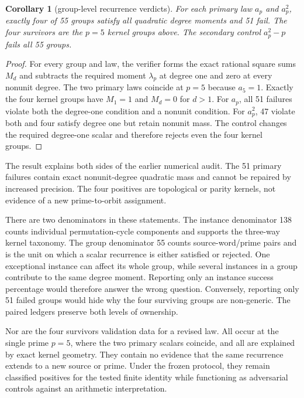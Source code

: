 \documentclass[11pt]{article}
\newtheorem{corollary}[theorem]{Corollary}
\theoremstyle{definition}
\theoremstyle{remark}
\begin{document}
\begin{corollary}[group-level recurrence verdicts]\label{cor:groups}
For each primary law $a_p$ and $a_p^2$, exactly four of 55 groups satisfy all quadratic degree moments and 51 fail. The four survivors are the $p=5$ kernel groups above. The secondary control $a_p^2-p$ fails all 55 groups.
\end{corollary}

\begin{proof}
For every group and law, the verifier forms the exact rational square sums $M_d$ and subtracts the required moment $\lambda_p$ at degree one and zero at every nonunit degree. The two primary laws coincide at $p=5$ because $a_5=1$. Exactly the four kernel groups have $M_1=1$ and $M_d=0$ for $d>1$. For $a_p$, all 51 failures violate both the degree-one condition and a nonunit condition. For $a_p^2$, 47 violate both and four satisfy degree one but retain nonunit mass. The control changes the required degree-one scalar and therefore rejects even the four kernel groups.
\end{proof}

The result explains both sides of the earlier numerical audit. The 51 primary failures contain exact nonunit-degree quadratic mass and cannot be repaired by increased precision. The four positives are topological or parity kernels, not evidence of a new prime-to-orbit assignment.

There are two denominators in these statements. The instance denominator 138 counts individual permutation-cycle components and supports the three-way kernel taxonomy. The group denominator 55 counts source-word/prime pairs and is the unit on which a scalar recurrence is either satisfied or rejected. One exceptional instance can affect its whole group, while several instances in a group contribute to the same degree moment. Reporting only an instance success percentage would therefore answer the wrong question. Conversely, reporting only 51 failed groups would hide why the four surviving groups are non-generic. The paired ledgers preserve both levels of ownership.

Nor are the four survivors validation data for a revised law. All occur at the single prime $p=5$, where the two primary scalars coincide, and all are explained by exact kernel geometry. They contain no evidence that the same recurrence extends to a new source or prime. Under the frozen protocol, they remain classified positives for the tested finite identity while functioning as adversarial controls against an arithmetic interpretation.
\end{document}
